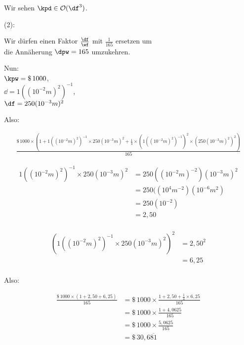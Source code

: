 \documentclass[a4paper,12pt]{article}
\begin{document}
Wir sehen $\kpd\in\mathcal{O}(\df^3)$.

(2):

Wir dürfen einen Faktor $\frac{\df}{\wf}$ mit $\frac{1}{165}$ ersetzen um \\
die Annäherung $\dpw=165$ umzukehren.

Nun: \\
$\kpw=\$\,1000$, \\
$\dd=1((10^{-2}m)^2)^{-1}$, \\
$\df=250(10^{-3}m)^2$

Also:

$$\begin{aligned}
    \frac{\$\,1000\times (1+1((10^{-2}m)^2)^{-1}\times250(10^{-3}m)^2+\frac{1}{4}\times(1((10^{-2}m)^2)^{-1})^2\times(250(10^{-3}m)^2)^2)}{165}
  \end{aligned}$$


$$\begin{aligned}
    1((10^{-2}m)^2)^{-1}\times250(10^{-3}m)^2 & =250((10^{-2}m)^{-2})(10^{-3}m)^2 \\
                                              & =250((10^4m^{-2})(10^{-6}m^2)     \\
                                              & =250(10^{-2})                     \\
                                              & =2,50                             \\
  \end{aligned}$$

$$\begin{aligned}
    (1((10^{-2}m)^2)^{-1}\times250(10^{-3}m)^2)^2 & =2,50^2 \\
                                                  & =6,25   \\
  \end{aligned}$$

Also:

$$\begin{aligned}
    \frac{\$\,1000\times (1+2,50+6,25)}{165} & =\$\,1000\times\frac{1+2,50+\frac{1}{4}\times 6,25}{165} \\
                                             & =\$\,1000\times\frac{1+4,0625}{165}                      \\
                                             & =\$\,1000\times\frac{5,0625}{165}                        \\
                                             & =\$\,30,6\overline{81}                                   \\
  \end{aligned}$$
\end{document}
